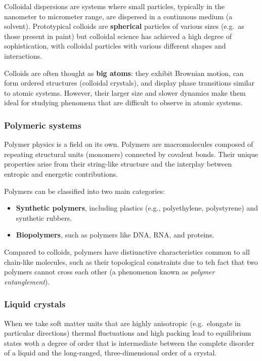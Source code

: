 \documentclass[
  letterpaper,
  enabledeprecatedfontcommands]{report}
\providecommand{\tightlist}{%
  \setlength{\itemsep}{0pt}\setlength{\parskip}{0pt}}
\begin{document}
Colloidal dispersions are systems where small particles, typically in
the nanometer to micrometer range, are dispersed in a continuous medium
(a solvent). Prototypical colloids are \textbf{spherical} particles of
various sizes (e.g.~as those present in paint) but colloidal science has
achieved a high degree of sophistication, with colloidal particles with
various different shapes and interactions.

Colloids are often thought as \textbf{big atoms}: they exhibit Brownian
motion, can form ordered structures (colloidal crystals), and display
phase transitions similar to atomic systems. However, their larger size
and slower dynamics make them ideal for studying phenomena that are
difficult to observe in atomic systems.

\subsubsection*{Polymeric systems}\label{polymeric-systems}

Polymer physics is a field on its own. Polymers are macromolecules
composed of repeating structural units (monomers) connected by covalent
bonds. Their unique properties arise from their string-like structure
and the interplay between entropic and energetic contributions.

Polymers can be classified into two main categories:

\begin{itemize}
\tightlist
\item
  \textbf{Synthetic polymers}, including plastics (e.g., polyethylene,
  polystyrene) and synthetic rubbers.
\item
  \textbf{Biopolymers}, such as polymers like DNA, RNA, and proteins.
\end{itemize}

Compared to colloids, polymers have distiunctive characteristics common
to all chain-like molecules, such as their topological constraints due
to teh fact that two polymers cannot cross each other (a phenomenon
known as \emph{polymer entanglement}).

\subsubsection*{Liquid crystals}\label{liquid-crystals}

When we take soft matter units that are highly anisotropic
(e.g.~elongate in particular directions) thermal fluctuations and high
packing lead to equilibrium states woth a degree of order that is
intermediate between the complete disorder of a liquid and the
long-ranged, three-dimensional order of a crystal.
\end{document}
